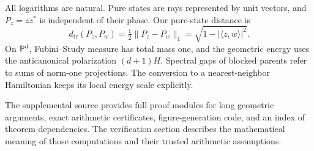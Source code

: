 All logarithms are natural. Pure states are rays represented by unit vectors,
and $P_z=zz^*$ is independent of their phase. Our pure-state distance is
\[
d_{\mathrm{tr}}(P_z,P_w)=\tfrac12\|P_z-P_w\|_1
=\sqrt{1-|\langle z,w\rangle|^2}.
\]
On $\mathbb P^d$, Fubini--Study measure has total mass one, and the geometric
energy uses the anticanonical polarization $(d+1)H$. Spectral gaps of blocked
parents refer to sums of norm-one projections. The conversion to a
nearest-neighbor Hamiltonian keeps its local energy scale explicitly.

The supplemental source provides full proof modules for long geometric
arguments, exact arithmetic certificates, figure-generation code, and an
index of theorem dependencies. The verification section describes the
mathematical meaning of those computations and their trusted arithmetic
assumptions.

